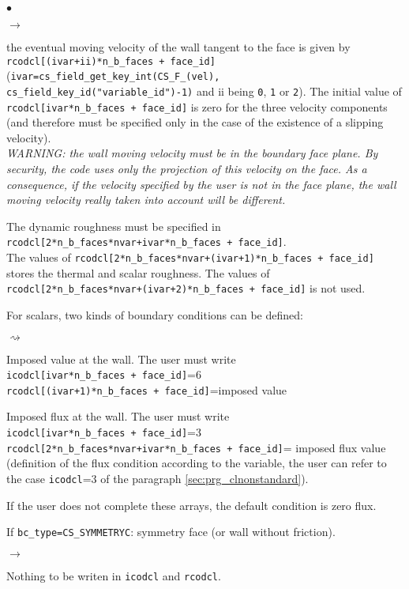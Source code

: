 \begin{list}{$\bullet$}{}
\begin{list}{$\rightarrow$}{}
\item the eventual moving velocity of the wall tangent to the face is
      given by \texttt{rcodcl[(ivar+ii)*n\_b\_faces + face\_id]} (\texttt{ivar=cs\_field\_get\_key\_int(CS\_F\_(vel),
      cs\_field\_key\_id("variable\_id")-1)} and ii being
      \texttt{0}, \texttt{1} or \texttt{2}). The initial
      value of \texttt{rcodcl[ivar*n\_b\_faces + face\_id]} is zero for
      the three velocity components (and therefore must be specified
      only in the case of the existence of a slipping velocity). \\
{\em WARNING: the wall moving velocity must be in the boundary face
      plane. By security, the code uses only the projection of this
      velocity on the face. As a consequence, if the velocity specified
      by the user is not in the face plane, the wall moving velocity really
      taken into account will be different.}
\item The dynamic roughness must be specified in \texttt{rcodcl[2*n\_b\_faces*nvar+ivar*n\_b\_faces + face\_id]}.\\
      The values of  \texttt{rcodcl[2*n\_b\_faces*nvar+(ivar+1)*n\_b\_faces + face\_id]} stores the thermal and scalar roughness.
      The values of \texttt{rcodcl[2*n\_b\_faces*nvar+(ivar+2)*n\_b\_faces + face\_id]} is not used.
\item For scalars, two kinds of boundary conditions can be defined:
\begin{list}{$\rightsquigarrow$}{}
\item Imposed value at the wall. The user must write\\
\hspace*{1cm}\texttt{icodcl[ivar*n\_b\_faces + face\_id]}=6\\
\hspace*{1cm}\texttt{rcodcl[(ivar+1)*n\_b\_faces + face\_id]}=imposed value\\
\item Imposed flux at the wall. The user must write\\
\hspace*{1cm}\texttt{icodcl[ivar*n\_b\_faces + face\_id]}=3\\
\hspace*{1cm}\texttt{rcodcl[2*n\_b\_faces*nvar+ivar*n\_b\_faces + face\_id]}= imposed flux value (definition
      of the flux condition according to the variable, the user can refer to the
      case \texttt{icodcl}=3 of the paragraph \ref{sec:prg_clnonstandard}).
\item If the user does not complete these arrays, the default condition
      is zero flux.
\end{list}
\end{list}
\item If \texttt{bc\_type=CS\_SYMMETRYC}: symmetry face (or wall without friction).
\begin{list}{$\rightarrow$}{}
\item Nothing to be writen in \texttt{icodcl} and  \texttt{rcodcl}.
\end{list}


\end{list}
